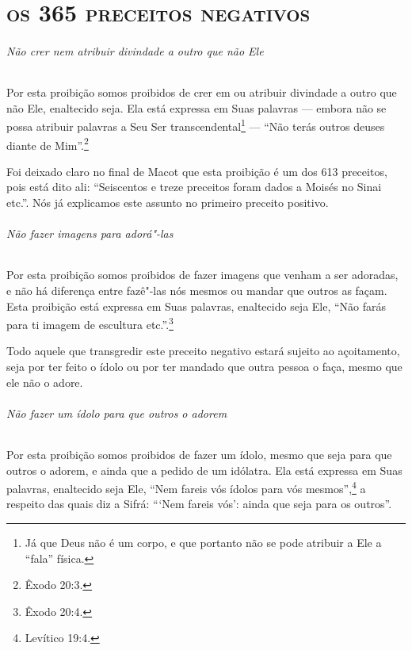 \setcounter{secnumdepth}{-2}

\part{\textsc{os 365 preceitos negativos}}


\begin{multicols}{2}
\setcounter{paragraph}{0}
\setcounter{secnumdepth}{4}

\paragraph{Não crer nem atribuir divindade a outro que não Ele}

Por esta proibição somos proibidos de crer em ou atribuir divindade a
outro que não Ele, enaltecido seja. Ela está expressa em Suas palavras
--- embora não se possa atribuir palavras a Seu Ser
transcendental\footnote{Já que Deus não é um corpo, e que portanto não se pode atribuir a Ele a ``fala'' física.} --- ``Não terás outros deuses
diante de Mim''.\footnote{Êxodo 20:3.}

Foi deixado claro no final de Macot\starr{} que esta proibição é um dos 613
preceitos, pois está dito ali: ``Seiscentos e treze preceitos foram
dados a Moisés no Sinai etc.''. Nós já explicamos este assunto no
primeiro preceito positivo.

\paragraph{Não fazer imagens para adorá"-las}

Por esta proibição somos proibidos de fazer imagens que venham a ser
adoradas, e não há diferença entre fazê"-las nós mesmos ou mandar que
outros as façam. Esta proibição está expressa em Suas palavras,
enaltecido seja Ele, ``Não farás para ti imagem de escultura etc.''.\footnote{Êxodo 20:4.}

Todo aquele que transgredir este preceito negativo estará sujeito ao
açoitamento, seja por ter feito o ídolo ou por ter mandado que outra
pessoa o faça, mesmo que ele não o adore.

\paragraph{Não fazer um ídolo para que outros o adorem}

Por esta proibição somos proibidos de fazer um ídolo, mesmo que seja
para que outros o adorem, e ainda que a pedido de um idólatra. Ela está
expressa em Suas palavras, enaltecido seja Ele, ``Nem fareis vós ídolos
para vós mesmos'',\footnote{Levítico 19:4.} a respeito das quais diz a Sifrá\starr:
```Nem fareis vós': ainda que seja para os outros''.


\end{multicols}
